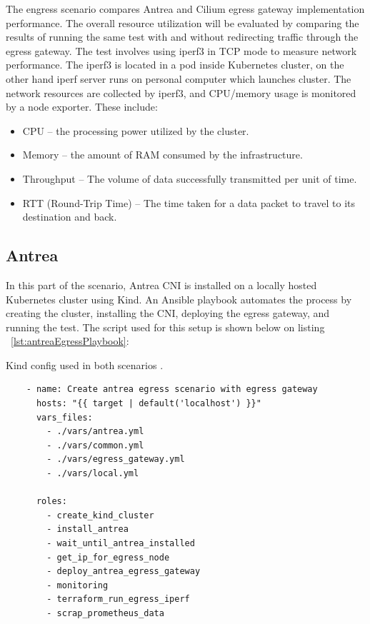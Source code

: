 The engress scenario compares Antrea and Cilium egress gateway implementation performance. The overall resource utilization will be evaluated by comparing the results of running the same test with and without redirecting traffic through the egress gateway. The test involves using iperf3 in TCP mode to measure network performance. The iperf3 is located in a pod inside Kubernetes cluster, on the other hand iperf server runs on personal computer which launches cluster. The network resources are collected by iperf3, and CPU/memory usage is monitored by a node exporter. These include:
\begin{itemize}
  \item CPU -- the processing power utilized by the cluster.
  \item Memory -- the amount of RAM consumed by the infrastructure.
  \item Throughput -- The volume of data successfully transmitted per unit of time.
  \item RTT (Round-Trip Time) -- The time taken for a data packet to travel to its destination and back.
\end{itemize}

\subsection{Antrea}
\label{sec:antreaEgress}

In this part of the scenario, Antrea CNI is installed on a locally hosted Kubernetes cluster using Kind. An Ansible playbook automates the process by creating the cluster, installing the CNI, deploying the egress gateway, and running the test. The script used for this setup is shown below on listing ~\ref{lst:antreaEgressPlaybook}:

\begin{listing}[H]
  \centering
  \caption{Kind config used in both scenarios \cite{KindConfig}.}
  \begin{verbatim}
    - name: Create antrea egress scenario with egress gateway
      hosts: "{{ target | default('localhost') }}"
      vars_files:
        - ./vars/antrea.yml
        - ./vars/common.yml
        - ./vars/egress_gateway.yml
        - ./vars/local.yml

      roles:
        - create_kind_cluster
        - install_antrea
        - wait_until_antrea_installed
        - get_ip_for_egress_node
        - deploy_antrea_egress_gateway
        - monitoring
        - terraform_run_egress_iperf
        - scrap_prometheus_data
  \end{verbatim}
  \label{lst:antreaEgressPlaybook}
\end{listing}


